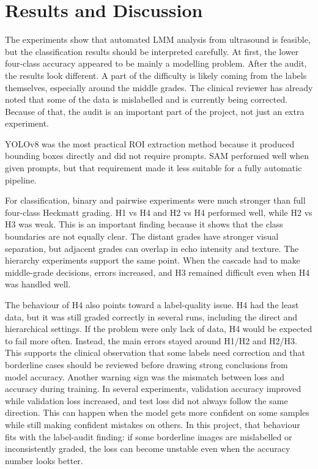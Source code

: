 \section{Results and Discussion}
\label{discussion}
The experiments show that automated LMM analysis from ultrasound is feasible, but the classification results should be interpreted carefully. At first, the lower four-class accuracy appeared to be mainly a modelling problem. After the audit, the results look different. A part of the difficulty is likely coming from the labels themselves, especially around the middle grades. The clinical reviewer has already noted that some of the data is mislabelled and is currently being corrected. Because of that, the audit is an important part of the project, not just an extra experiment.

YOLOv8 was the most practical ROI extraction method because it produced bounding boxes directly and did not require prompts. SAM performed well when given prompts, but that requirement made it less suitable for a fully automatic pipeline.

For classification, binary and pairwise experiments were much stronger than full four-class Heckmatt grading. H1 vs H4 and H2 vs H4 performed well, while H2 vs H3 was weak. This is an important finding because it shows that the class boundaries are not equally clear. The distant grades have stronger visual separation, but adjacent grades can overlap in echo intensity and texture. The hierarchy experiments support the same point. When the cascade had to make middle-grade decisions, errors increased, and H3 remained difficult even when H4 was handled well.

The behaviour of H4 also points toward a label-quality issue. H4 had the least data, but it was still graded correctly in several runs, including the direct and hierarchical settings. If the problem were only lack of data, H4 would be expected to fail more often. Instead, the main errors stayed around H1/H2 and H2/H3. This supports the clinical observation that some labels need correction and that borderline cases should be reviewed before drawing strong conclusions from model accuracy.
Another warning sign was the mismatch between loss and accuracy during training. In several experiments, validation accuracy improved while validation loss increased, and test loss did not always follow the same direction. This can happen when the model gets more confident on some samples while still making confident mistakes on others. In this project, that behaviour fits with the label-audit finding: if some borderline images are mislabelled or inconsistently graded, the loss can become unstable even when the accuracy number looks better.

